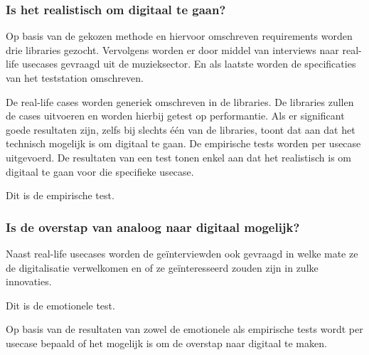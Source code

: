\subsubsection{Is het realistisch om digitaal te gaan?}

Op basis van de gekozen methode en hiervoor omschreven requirements worden drie libraries gezocht. Vervolgens worden er door middel van interviews naar real-life usecases gevraagd uit de muzieksector. En als laatste worden de specificaties van het teststation omschreven.

De real-life cases worden generiek omschreven in de libraries. De libraries zullen de cases uitvoeren en worden hierbij getest op performantie. Als er significant goede resultaten zijn, zelfs bij slechts één van de libraries, toont dat aan dat het technisch mogelijk is om digitaal te gaan. De empirische tests worden per usecase uitgevoerd. De resultaten van een test tonen enkel aan dat het realistisch is om digitaal te gaan voor die specifieke usecase.

Dit is de empirische test.

\subsubsection{Is de overstap van analoog naar digitaal mogelijk?}

Naast real-life usecases worden de geïnterviewden ook gevraagd in welke mate ze de digitalisatie verwelkomen en of ze geïnteresseerd zouden zijn in zulke innovaties.

Dit is de emotionele test.

Op basis van de resultaten van zowel de emotionele als empirische tests wordt per usecase bepaald of het mogelijk is om de overstap naar digitaal te maken.

\iffalse

Wees zo concreet mogelijk bij het formuleren van je onderzoeksvraag. Een onderzoeksvraag is trouwens iets waar nog niemand op dit moment een antwoord heeft (voor zover je kan nagaan). Het opzoeken van bestaande informatie (bv. ``welke tools bestaan er voor deze toepassing?'') is dus geen onderzoeksvraag. Je kan de onderzoeksvraag verder specifiëren in deelvragen. Bv.~als je onderzoek gaat over performantiemetingen, dan 

\fi

\section{}
\label{sec:onderzoeksdoelstelling}

